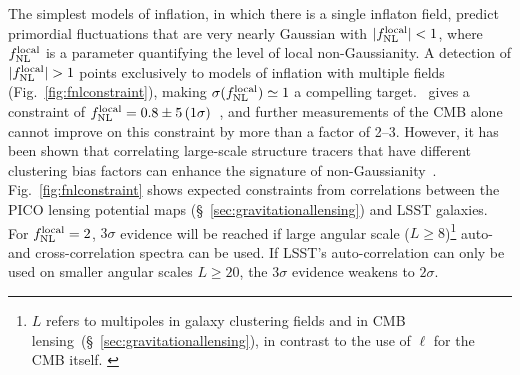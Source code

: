 \documentclass[PICOReport.tex]{subfiles}
\begin{document}
The simplest models of inflation, in which there is a single inflaton field, predict primordial fluctuations that are very nearly Gaussian with $|f^{\rm local}_{\rm NL}| <1$, where $f^{\rm local}_{\rm NL}$ is a parameter quantifying the level of local non-Gaussianity. A detection of $|f^{\rm local}_{\rm NL}| >1$ points exclusively to models of inflation with multiple fields (Fig.~\ref{fig:fnlconstraint}), making $\sigma (f^{\rm local}_{\rm NL}) \simeq 1$ a compelling target. \planck\ gives a constraint of $f^{\rm local}_{\rm NL} = 0.8 \pm 5 \, (1\sigma)$~\citep{planck2015_17}, and further measurements of the \ac{CMB} alone cannot improve on this constraint by more than a factor of 2--3. However, it has been shown that correlating large-scale structure tracers that have different clustering bias factors can enhance the signature of non-Gaussianity~\citep{2009PhRvL.102b1302S,2018PhRvD..97l3540S,2008PhRvD..77l3514D}. Fig.~\ref{fig:fnlconstraint} shows expected constraints from correlations between the PICO lensing potential maps (\S~\ref{sec:gravitationallensing}) and LSST galaxies. For $f^{\rm local}_{\rm NL}=2$, $3\sigma$ evidence will be reached if large angular scale ($L\ge 8$)\footnote{$L$ refers to multipoles in galaxy clustering fields and in CMB lensing~(\S~\ref{sec:gravitationallensing}), in contrast to the use of $\ell$  for the CMB itself. \label{foot:L}} auto- and cross-correlation spectra can be used. If LSST's auto-correlation can only be used on smaller angular scales $L\ge 20$, the $3\sigma$ evidence weakens to $2\sigma$. 
\end{document}
